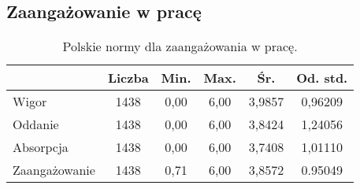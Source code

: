 \FloatBarrier

\subsection{Zaangażowanie w pracę}
\label{sec:app-uwes-norms}

\begin{table}[h!]
\begin{center}
\begin{tabular}{l | c c c c c}
  & Liczba & Min. & Max. & Śr. & Od. std. \\ \hline
Wigor & 1438 & 0,00 & 6,00 & 3,9857 & 0,96209 \\
Oddanie & 1438 &  0,00 & 6,00 & 3,8424 & 1,24056 \\
Absorpcja & 1438 & 0,00 & 6,00 & 3,7408 & 1,01110 \\ \hline
Zaangażowanie & 1438 & 0,71 & 6,00 & 3,8572 & 0.95049 \\
\end{tabular}
\end{center}
\caption{Polskie normy dla zaangażowania w pracę.}
\label{tab:uwes-pl-norms}
\end{table}

\FloatBarrier
